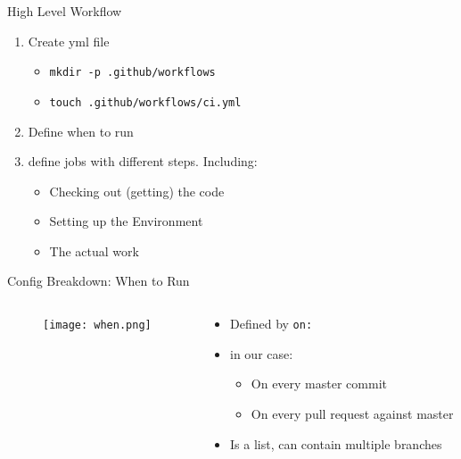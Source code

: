 \documentclass[compress,aspectratio=169]{beamer}
\begin{document}
	\begin{frame}{High Level Workflow}
    \begin{enumerate}
      \item Create yml file
        \begin{itemize}
          \item \texttt{mkdir -p .github/workflows}
          \item \texttt{touch .github/workflows/ci.yml}
        \end{itemize}
      \item Define when to run
      \item define jobs with different steps. Including:
        \begin{itemize}
          \item Checking out (getting) the code 
          \item Setting up the Environment
          \item The actual work
        \end{itemize}
    \end{enumerate}
	\end{frame}

	\begin{frame}{Config Breakdown: When to Run}
    \begin{columns}
      \begin{column}{0.5\textwidth}
        \begin{figure}
          \begin{center}
            \texttt{[image: when.png]}
          \end{center}
        \end{figure}
      \end{column}
      \begin{column}{0.5\textwidth}
        \begin{itemize}
          \item Defined by \texttt{on:}
          \item in our case:
          \begin{itemize}
            \item On every master commit
            \item On every pull request against master
          \end{itemize}
        \item Is a list, can contain multiple branches
        \end{itemize}
      \end{column}
    \end{columns}
	\end{frame}
\end{document}
